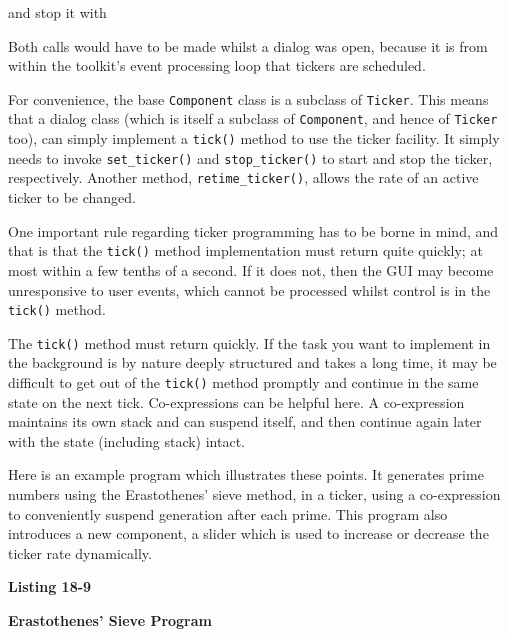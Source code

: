 \noindent and stop it with


Both calls would have to be made whilst a dialog was open, because it is
from within the toolkit's event processing loop that
tickers are scheduled.

For convenience, the base \texttt{Component} class is a subclass of
\texttt{Ticker}. This means that a dialog class (which is itself a
subclass of \texttt{Component}, and hence of \texttt{Ticker} too), can
simply implement a \texttt{tick()} method to use the ticker facility.
It simply needs to invoke \texttt{set\_ticker()} and
\texttt{stop\_ticker()} to start and stop the ticker, respectively.
Another method, \texttt{retime\_ticker()}, allows the rate of an
active ticker to be changed.

One important rule regarding ticker programming has to be borne in mind,
and that is that the \texttt{tick()} method implementation must return
quite quickly; at most within a few tenths of a second. If it does
not, then the GUI may become unresponsive to user events, which cannot
be processed whilst control is in the \texttt{tick()} method.

The \texttt{tick()} method must return quickly. If the
task you want to implement in the background is by nature deeply
structured and takes a long time, it may be difficult
to get out of the \texttt{tick()} method promptly and continue in the
same state on the next tick.  Co-expressions can
be helpful here. A co-expression
maintains its own stack and can suspend itself, and then
continue again later with the state (including stack) intact.

Here is an example program which illustrates these points. It
generates prime numbers using the Erastothenes' sieve
method, in a ticker, using a co-expression to conveniently suspend
generation after each prime.
This program also introduces a new component, a slider which is
used to increase or decrease the ticker rate dynamically.

{\sffamily\bfseries
Listing 18-9}

{\sffamily\bfseries
Erastothenes' Sieve Program}

